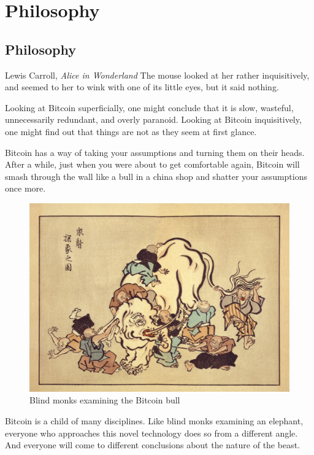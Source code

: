 \part{Philosophy}
\label{ch:philosophy}

\chapter*{Philosophy}
\begin{chapquote}{Lewis Carroll, \textit{Alice in Wonderland}}
The mouse looked at her rather inquisitively, and seemed to her to wink with one
of its little eyes, but it said nothing.
\end{chapquote}

Looking at Bitcoin superficially, one might conclude that it is slow, wasteful,
unnecessarily redundant, and overly paranoid. Looking at Bitcoin inquisitively,
one might find out that things are not as they seem at first glance.

Bitcoin has a way of taking your assumptions and turning them on their heads.
After a while, just when you were about to get comfortable again, Bitcoin will
smash through the wall like a bull in a china shop and shatter your assumptions
once more.

\begin{figure}
  \includegraphics{assets/images/blind-monks.jpg}
  \caption{Blind monks examining the Bitcoin bull}
  \label{fig:blind-monks}
\end{figure}

Bitcoin is a child of many disciplines. Like blind monks examining an elephant,
everyone who approaches this novel technology does so from a different angle.
And everyone will come to different conclusions about the nature of the beast.

